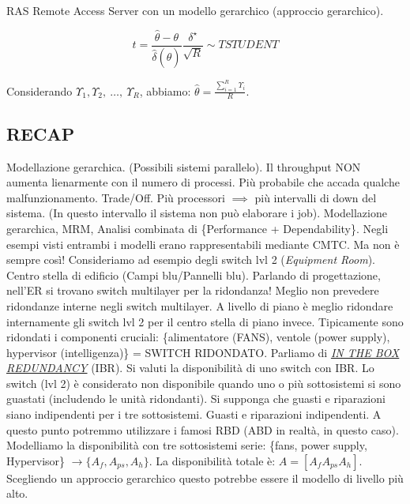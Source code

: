 RAS Remote Access Server con un modello gerarchico (approccio gerarchico).

\[
	t = \frac{\hat{\theta}-\theta}{\hat{\delta}(\hat{\theta})} \frac{\delta^\star}{\sqrt{R}} \sim T STUDENT
\]

Considerando $\Upsilon_1,\Upsilon_2,\ \dots,\ \Upsilon_R$, abbiamo: $\hat{\theta} = \frac{\sum_{i=1}^R{\Upsilon_i}}{R}$.


\subsection{RECAP}

Modellazione gerarchica. (Possibili sistemi parallelo). Il throughput NON aumenta lienarmente con il numero di processi. Più probabile che accada qualche malfunzionamento. Trade/Off. Più processori $\implies$ più intervalli di down del sistema. (In questo intervallo il sistema non può elaborare i job). Modellazione gerarchica, MRM, Analisi combinata di \{Performance + Dependability\}. Negli esempi visti entrambi i modelli erano rappresentabili mediante CMTC. Ma non è sempre così! Consideriamo ad esempio degli switch lvl 2 (\textit{Equipment Room}). Centro stella di edificio (Campi blu/Pannelli blu). Parlando di progettazione, nell'ER si trovano switch multilayer per la ridondanza! Meglio non prevedere ridondanze interne negli switch multilayer. A livello di piano è meglio ridondare internamente gli switch lvl 2 per il centro stella di piano invece. Tipicamente sono ridondati i componenti cruciali: \{alimentatore (FANS), ventole (power supply), hypervisor (intelligenza)\} = SWITCH RIDONDATO. Parliamo di \underline{\textit{IN THE BOX REDUNDANCY}} (IBR). Si valuti la disponibilità di uno switch con IBR. Lo switch (lvl 2) è considerato non disponibile quando uno o più sottosistemi si sono guastati (includendo le unità ridondanti). Si supponga che guasti e riparazioni siano indipendenti per i tre sottosistemi. Guasti e riparazioni indipendenti. A questo punto potremmo utilizzare i famosi RBD (ABD in realtà, in questo caso). Modelliamo la disponibilità con tre sottosistemi serie: \{fans, power supply, Hypervisor\} $\rightarrow \{A_f, A_{ps}, A_h\}$. La disponibilità totale è: $A = [A_fA_{ps}A_h]$. Scegliendo un approccio gerarchico questo potrebbe essere il modello di livello più alto.

